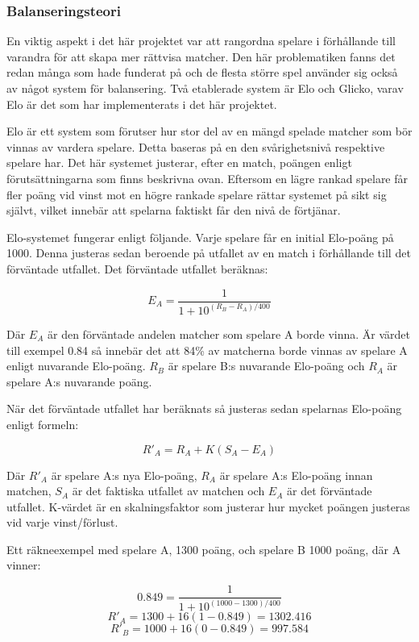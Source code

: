 \documentclass[a4paper, 11pt]{article}
\begin{document}
\subsubsection{Balanseringsteori}
En viktig aspekt i det här projektet var att rangordna spelare i förhållande till varandra för att skapa mer rättvisa matcher. Den här problematiken fanns det redan många som hade funderat på och de flesta större spel använder sig också av något system för balansering. Två etablerade system är Elo och Glicko, varav Elo är det som har implementerats i det här projektet.

Elo är ett system som förutser hur stor del av en mängd spelade matcher som bör vinnas av vardera spelare. Detta baseras på en den svårighetsnivå respektive spelare har. Det här systemet justerar, efter en match, poängen enligt förutsättningarna som finns beskrivna ovan. Eftersom en lägre rankad spelare får fler poäng vid vinst mot en högre rankade spelare rättar systemet på sikt sig självt, vilket innebär att spelarna faktiskt får den nivå de förtjänar.

Elo-systemet fungerar enligt följande. Varje spelare får en initial Elo-poäng på 1000. Denna justeras sedan beroende på utfallet av en match i förhållande till det förväntade utfallet. Det förväntade utfallet beräknas:

$$E_A = \frac{1}{1+10^{(R_B-R_A)/400}}$$

Där $E_A$ är den förväntade andelen matcher som spelare A borde vinna. Är värdet till exempel 0.84 så innebär det att 84\% av matcherna borde vinnas av spelare A enligt nuvarande Elo-poäng. $R_B$ är spelare B:s nuvarande Elo-poäng och $R_A$ är spelare A:s nuvarande poäng.

När det förväntade utfallet har beräknats så justeras sedan spelarnas Elo-poäng enligt formeln:

$$R'_A = R_A + K(S_A-E_A)$$

Där $R'_A$ är spelare A:s nya Elo-poäng, $R_A$ är spelare A:s Elo-poäng innan matchen, $S_A$ är det faktiska utfallet av matchen och $E_A$ är det förväntade utfallet. K-värdet är en skalningsfaktor som justerar hur mycket poängen justeras vid varje vinst/förlust.

Ett räkneexempel med spelare A, 1300 poäng, och spelare B 1000 poäng, där A vinner:

$$0.849 = \frac{1}{1+10^{(1000-1300)/400}}$$
$$ R'_A = 1300 + 16(1-0.849) = 1302.416 $$
$$ R'_B = 1000 + 16(0-0.849) = 997.584 $$
\end{document}
